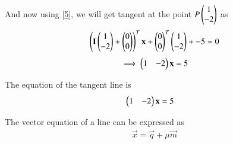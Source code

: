 \documentclass[journal,12pt,twocolumn]{IEEEtran}
\begin{document}
And now using \eqref{5}, we will get tangent at the point $P\begin{pmatrix}1\\-2\end{pmatrix}$ as
\begin{align}
    \left(\mathbf{I}\begin{pmatrix}1\\-2\end{pmatrix}+\begin{pmatrix}0\\0\end{pmatrix}\right)^T\mathbf{x}+\begin{pmatrix}0\\0\end{pmatrix}^T\begin{pmatrix}1\\-2\end{pmatrix}+{-5} = 0
\end{align}
\begin{align}
    \implies \begin{pmatrix}1&-2\end{pmatrix}\mathbf{x}= 5
\end{align}


The equation of the tangent line is
\begin{align}
\begin{pmatrix}1&-2\end{pmatrix}\mathbf{x}&= 5 \label{a}
\end{align}

The vector equation of a line can be expressed as 
\begin{align}
    \vec{x} = \vec{q} +\mu\vec{m}\label{c}
\end{align}
\end{document}
